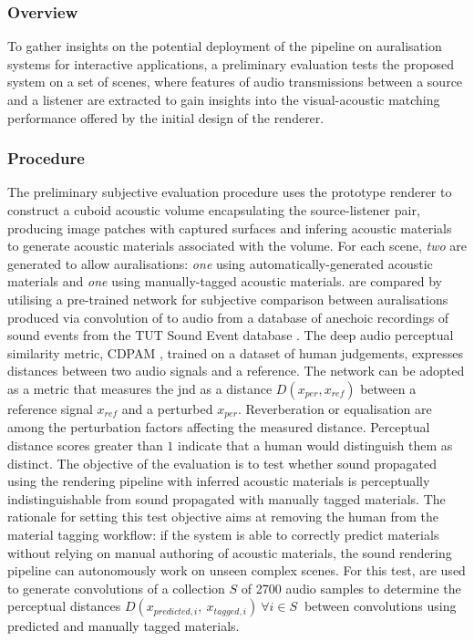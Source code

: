 \subsubsection{Overview}
To gather insights on the potential deployment of the pipeline on auralisation systems for interactive applications, a preliminary evaluation tests the proposed system on a set of scenes, where features of audio transmissions between a source and a listener are extracted to gain insights into the visual-acoustic matching performance offered by the initial design of the renderer. \par

\subsubsection{Procedure}
The preliminary subjective evaluation procedure uses the prototype renderer to construct a cuboid acoustic volume encapsulating the source-listener pair, producing image patches with captured surfaces and infering acoustic materials to generate acoustic materials associated with the volume. For each scene, \emph{two}  are generated to allow auralisations: \emph{one} using automatically-generated acoustic materials and \emph{one} using manually-tagged acoustic materials.  are compared by utilising a pre-trained network for subjective comparison between auralisations produced via convolution of  to audio from a database of anechoic recordings of sound events from the TUT Sound Event database \citep{sharath_adavanne_2018_1237752}. The deep audio perceptual similarity metric, CDPAM \citep{manocha2021cdpam}, trained on a dataset of human judgements, expresses distances between two audio signals and a reference. The network can be adopted as a metric that measures the \acrfull{jnd} as a distance $D(x_{per}, x_{ref})$ between a reference signal $x_{ref}$ and a perturbed $x_{per}$. Reverberation or equalisation are among the perturbation factors affecting the measured distance. Perceptual distance scores greater than $1$ indicate that a human would distinguish them as distinct. The objective of the evaluation is to test whether sound propagated using the rendering pipeline with inferred acoustic materials is perceptually indistinguishable from sound propagated with manually tagged materials. The rationale for setting this test objective aims at removing the human from the material tagging workflow: if the system is able to correctly predict materials without relying on manual authoring of acoustic materials, the sound rendering pipeline can autonomously work on unseen complex scenes. For this test,  are used to generate convolutions of a collection $S$ of 2700 audio samples to determine the perceptual distances $D(x_{predicted, i},~x_{tagged, i})~\forall i \in S~$ between convolutions using predicted and manually tagged materials.\par

